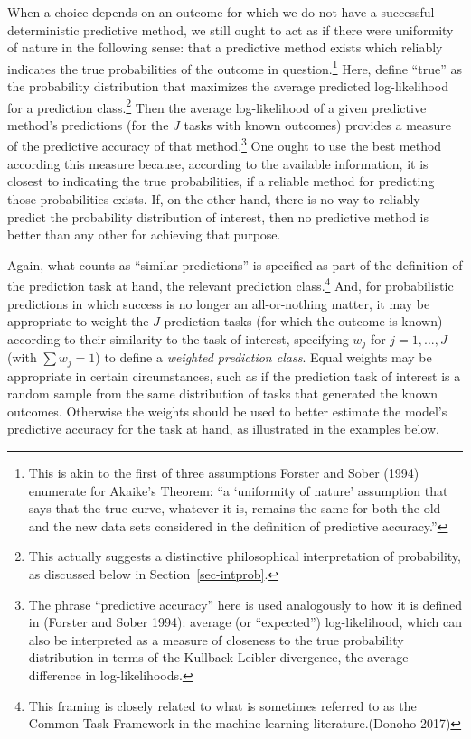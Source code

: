 \documentclass[
  letterpaper,
  DIV=11,
  numbers=noendperiod]{scrartcl}
\theoremstyle{definition}
\theoremstyle{remark}
\begin{document}
When a choice depends on an outcome for which we do not have a
successful deterministic predictive method, we still ought to act as if
there were uniformity of nature in the following sense: that a
predictive method exists which reliably indicates the true probabilities
of the outcome in question.\footnote{This is akin to the first of three
  assumptions Forster and Sober (1994) enumerate for Akaike's Theorem:
  ``a `uniformity of nature' assumption that says that the true curve,
  whatever it is, remains the same for both the old and the new data
  sets considered in the definition of predictive accuracy.''} Here,
define ``true'' as the probability distribution that maximizes the
average predicted log-likelihood for a prediction class.\footnote{This
  actually suggests a distinctive philosophical interpretation of
  probability, as discussed below in Section~\ref{sec-intprob}.} Then
the average log-likelihood of a given predictive method's predictions
(for the \(J\) tasks with known outcomes) provides a measure of the
predictive accuracy of that method.\footnote{The phrase ``predictive
  accuracy'' here is used analogously to how it is defined in (Forster
  and Sober 1994): average (or ``expected'') log-likelihood, which can
  also be interpreted as a measure of closeness to the true probability
  distribution in terms of the Kullback-Leibler divergence, the average
  difference in log-likelihoods.} One ought to use the best method
according this measure because, according to the available information,
it is closest to indicating the true probabilities, if a reliable method
for predicting those probabilities exists. If, on the other hand, there
is no way to reliably predict the probability distribution of interest,
then no predictive method is better than any other for achieving that
purpose.

Again, what counts as ``similar predictions'' is specified as part of
the definition of the prediction task at hand, the relevant prediction
class.\footnote{This framing is closely related to what is sometimes
  referred to as the Common Task Framework in the machine learning
  literature.(Donoho 2017)} And, for probabilistic predictions in which
success is no longer an all-or-nothing matter, it may be appropriate to
weight the \(J\) prediction tasks (for which the outcome is known)
according to their similarity to the task of interest, specifying
\(w_j\) for \(j=1, ..., J\) (with \(\sum w_j = 1\)) to define a
\emph{weighted prediction class}. Equal weights may be appropriate in
certain circumstances, such as if the prediction task of interest is a
random sample from the same distribution of tasks that generated the
known outcomes. Otherwise the weights should be used to better estimate
the model's predictive accuracy for the task at hand, as illustrated in
the examples below.
\end{document}
